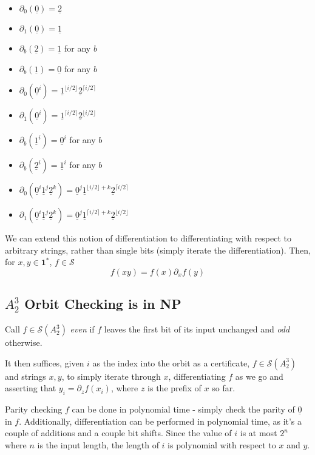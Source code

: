 \documentclass{article}
\newcommand{\0}{\underline{0}}
\newcommand{\1}{\underline{1}}
\newcommand{\2}{\underline{2}}
\renewcommand{\S}{\mathcal{S}}
\begin{document}
\begin{multicols}{2}
\begin{itemize}
\item $\partial_0(\0) = \2$
\item $\partial_1(\0) = \1$
\item $\partial_b(\2) = \1$ for any $b$
\item $\partial_b(\1) = \0$ for any $b$
\end{itemize}

\begin{itemize}
\item $\partial_0(\0^i) = \1^{\lfloor i / 2 \rfloor}\2^{\lceil i / 2 \rceil}$
\item $\partial_1(\0^i) = \1^{\lceil i / 2 \rceil}\2^{\lfloor i / 2 \rfloor}$
\item $\partial_b(\1^i) = \0^i$ for any $b$
\item $\partial_b(\2^i) = \1^i$ for any $b$
\item $\partial_0(\0^i\1^j\2^k) = \0^j\1^{\lfloor i / 2 \rfloor+k}\2^{\lceil i / 2 \rceil}$
\item $\partial_1(\0^i\1^j\2^k) = \0^j\1^{\lceil i / 2 \rceil+k}\2^{\lfloor i / 2 \rfloor}$
\end{itemize}
\end{multicols}
We can extend this notion of differentiation to differentiating with respect to arbitrary strings, rather than single bits (simply iterate the differentiation). Then, for $x, y \in \textbf{1}^*$, $f \in \S$
$$f(xy) = f(x) \partial_xf(y)$$

\subsection*{$A^3_2$ Orbit Checking is in NP}

Call $f \in \S(A^3_2)$ \textit{even} if $f$ leaves the first bit of its input unchanged and \textit{odd} otherwise.

It then suffices, given $i$ as the index into the orbit as a certificate, $f \in \S(A^3_2)$ and strings $x, y$, to simply iterate through $x$, differentiating $f$ as we go and asserting that $y_i = \partial_zf(x_i)$, where $z$ is the prefix of $x$ so far.

Parity checking $f$ can be done in polynomial time - simply check the parity of $\0$ in $f$. Additionally, differentiation can be performed in polynomial time, as it's a couple of additions and a couple bit shifts. Since the value of $i$ is at most $2^n$ where $n$ is the input length, the length of $i$ is polynomial with respect to $x$ and $y$.
\end{document}
